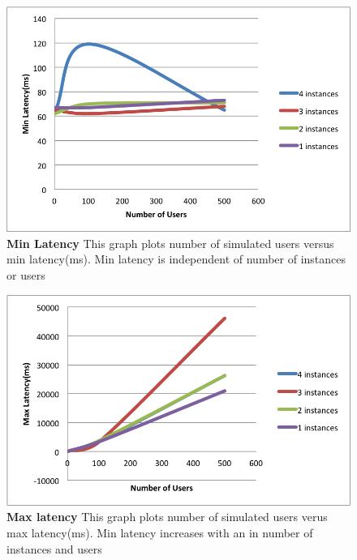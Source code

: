 \documentclass[12pt]{article}
\begin{document}
\begin{multicols}{2}
\begin{figure}[H] 
\centering
\includegraphics[scale=0.6]{Images/min_latency.PNG} 
\caption{\textbf{Min Latency} This graph plots number of simulated users versus min latency(ms). 
Min latency is independent of number of instances or users} 
\label{fig:min_latency}
\end{figure} 

\begin{figure}[H] 
\centering
\includegraphics[scale=0.64]{Images/max_latency.PNG} \caption{\textbf{Max
latency} This graph plots number of simulated users verus max latency(ms). Min latency 
increases with an in number of instances and users } 
\label{fig:max_latency} 
\end{figure} 
\end{multicols}
\end{document}
